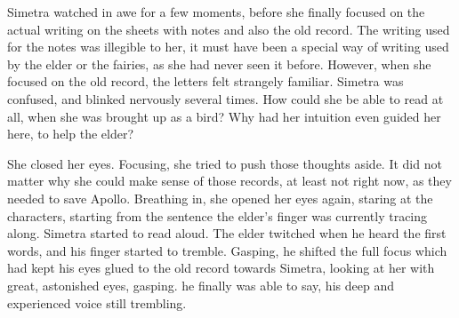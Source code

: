 Simetra watched in awe for a few moments, before she finally focused on the actual writing on the sheets with notes and also the old record. The writing used for the notes was illegible to her, it must have been a special way of writing used by the elder or the fairies, as she had never seen it before. However, when she focused on the old record, the letters felt strangely familiar. Simetra was confused, and blinked nervously several times. How could she be able to read at all, when she was brought up as a bird? Why had her intuition even guided her here, to help the elder?

She closed her eyes. Focusing, she tried to push those thoughts aside. It did not matter why she could make sense of those records, at least not right now, as they needed to save Apollo. Breathing in, she opened her eyes again, staring at the characters, starting from the sentence the elder's finger was currently tracing along.  Simetra started to read aloud. The elder twitched when he heard the first words, and his finger started to tremble. Gasping, he shifted the full focus which had kept his eyes glued to the old record towards Simetra, looking at her with great, astonished eyes, gasping.  he finally was able to say, his deep and experienced voice still trembling. 
